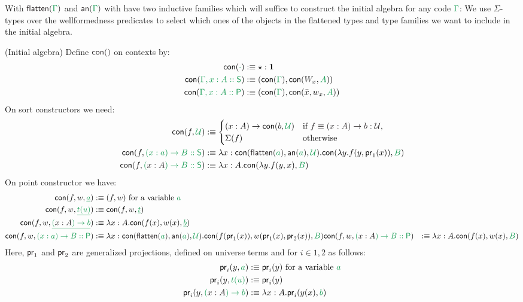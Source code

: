 \documentclass[12pt,headings=optiontohead,openany,oneside,a4paper]{book}
\theoremstyle{definition}
\newcommand{\unit}{\mathbf{1}}
\newcommand{\UU}{\mathcal{U}}
\newcommand{\pr}{\mathsf{pr}}
\newcommand{\gr}[1]{{\color{ForestGreen}#1}}
\newcommand{\grm}[1]{\ensuremath{\gr{#1}}}
\newcommand{\blm}[1]{\ensuremath{{\color{Black}#1}}}
\newcommand{\Sc}{\mathsf{S}}
\newcommand{\Pc}{\mathsf{P}}
\newcommand{\con}[1]{\mathsf{con}(\grm{#1})}
\newcommand{\contwo}[2]{\mathsf{con}(#1,\grm{#2})}
\newcommand{\conthree}[3]{\mathsf{con}(#1, #2, \grm{#3})}
\newcommand{\flatten}[1]{\blm{\mathsf{flatten}(\grm{#1})}}
\newcommand{\annotate}[1]{\blm{\mathsf{an}(\grm{#1})}}
\begin{document}
With \grm{\flatten{\Gamma}} and \grm{\annotate{\Gamma}} with have two inductive
families which will suffice to construct the initial algebra for any code \grm{\Gamma}:
We use $\Sigma$-types over the wellformedness predicates to select which ones of
the objects in the flattened types and type families we want to include in the
initial algebra.

\begin{defn}(Initial algebra)
Define \blm{\con{}} on contexts by:
\begin{align*}
\con{\cdot} &:\equiv \star : \unit \\
\con{\Gamma, x : A :: \Sc} &:\equiv (\con{\Gamma}, \contwo{W_x}{A}) \\
\con{\Gamma, x : A :: \Pc} &:\equiv (\con{\Gamma}, \conthree{\bar{x}}{w_x}{A}) \\
\end{align*}
On sort constructors we need:
\begin{align*}
\contwo{f}{\UU} &:\equiv
\begin{cases}
(x : A) \to \contwo{b}{\UU} & \text{if \blm{f \equiv (x : A) \to b : \UU},} \\
\Sigma(f) & \text{otherwise} %
\end{cases}\\
\contwo{f}{(x : a) \to B :: \Sc} &:\equiv \lambda x : \conthree{\flatten{a}}{\annotate{a}}{\UU}. \contwo{\lambda y. f(y, \pr_1(x))}{B} \\ %
\contwo{f}{(\blm{x : A}) \to B :: \Sc} &:\equiv \lambda x : A. \contwo{\lambda y. f(y, x)}{B}
\end{align*}
On point constructor we have:
\begin{align*}
\conthree{f}{w}{\underline{a}} &:\equiv (f, w) \text{ for a variable \grm{a}} \\
\conthree{f}{w}{\underline{t(u)}} &:\equiv \conthree{f}{w}{\underline{t}} \\
\conthree{f}{w}{\underline{(\blm{x : A}) \to b}} &:\equiv \lambda x : A. \conthree{f(x)}{w(x)}{\underline{b}} \\
\conthree{f}{w}{(x : a) \to B :: \Pc} &:\equiv
\lambda x : \conthree{\flatten{a}}{\annotate{a}}{\UU}. \conthree{f(\pr_1(x))}{w(\pr_1(x), \pr_2(x))}{B} %
\conthree{f}{w}{(\blm{x : A}) \to B :: \Pc} &:\equiv
\lambda x : A. \conthree{f(x)}{w(x)}{B}
\end{align*}
Here, \blm{\pr_1} and \blm{\pr_2} are generalized projections, defined on universe
terms and for $i \in {1, 2}$ as follows:
\begin{align*}
\pr_i(y, \grm{a}) &:\equiv \pr_i(y) \text{ for a variable \grm{a}} \\
\pr_i(y, \grm{t(u)}) &:\equiv \pr_i(y) \\ %
\pr_i(y, \grm{(\blm{x : A}) \to b}) &:\equiv \lambda x : A. \pr_i(y(x), \grm{b})
\end{align*}
\end{defn}



\end{document}
